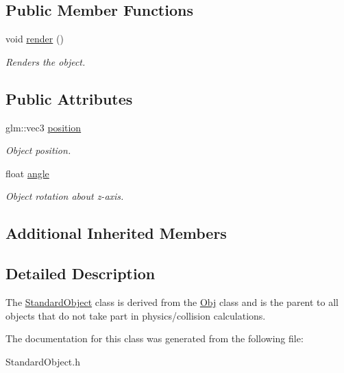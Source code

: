 \subsection*{Public Member Functions}
\begin{DoxyCompactItemize}
\item 
void \hyperlink{class_standard_object_a6f7910abadbf3b485b96b11c32f8a1be}{render} ()\hypertarget{class_standard_object_a6f7910abadbf3b485b96b11c32f8a1be}{}\label{class_standard_object_a6f7910abadbf3b485b96b11c32f8a1be}

\begin{DoxyCompactList}\small\item\em Renders the object. \end{DoxyCompactList}\end{DoxyCompactItemize}
\subsection*{Public Attributes}
\begin{DoxyCompactItemize}
\item 
glm\+::vec3 \hyperlink{class_standard_object_a8b6ed66159dfded1624720417d20a6c4}{position}\hypertarget{class_standard_object_a8b6ed66159dfded1624720417d20a6c4}{}\label{class_standard_object_a8b6ed66159dfded1624720417d20a6c4}

\begin{DoxyCompactList}\small\item\em Object position. \end{DoxyCompactList}\item 
float \hyperlink{class_standard_object_a7cafbb9e057f7629dbbb835612af7ae2}{angle}\hypertarget{class_standard_object_a7cafbb9e057f7629dbbb835612af7ae2}{}\label{class_standard_object_a7cafbb9e057f7629dbbb835612af7ae2}

\begin{DoxyCompactList}\small\item\em Object rotation about z-\/axis. \end{DoxyCompactList}\end{DoxyCompactItemize}
\subsection*{Additional Inherited Members}


\subsection{Detailed Description}
The \hyperlink{class_standard_object}{Standard\+Object} class is derived from the \hyperlink{class_obj}{Obj} class and is the parent to all objects that do not take part in physics/collision calculations. 

The documentation for this class was generated from the following file\+:\begin{DoxyCompactItemize}
\item 
Standard\+Object.\+h\end{DoxyCompactItemize}
